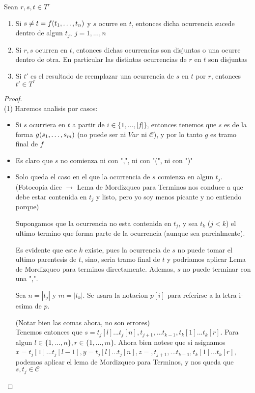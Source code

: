 \begin{lemma}
  Sean $r, s, t \in T^\tau$
  \begin{enumerate}
    \item Si $s \neq t = f(t_{1}, \dots, t_{n})$ y $s$ ocurre en $t$, entonces dicha ocurrencia sucede dentro de algun $t_j,\ j = 1, \dots, n$
    \item Si $r, s$ ocurren en $t$, entonces dichas ocurrencias son disjuntas o una ocurre dentro de otra. En particular las distintas ocurrencias de $r$ en $t$ son disjuntas
    \item Si $t'$ es el resultado de reemplazar una ocurrencia de $s$ en $t$ por $r$, entonces $t' \in T^\tau$
  \end{enumerate}
\end{lemma}
\begin{proof}
  $ $\\
  (1) Haremos analisis por casos:
  \begin{itemize}
    \item Si $s$ ocurriera en $t$ a partir de $i\in\{1,\dots,|f|\}$, entonces tenemos que $s$ es de la forma $g(s_{1}, \dots, s_{m})$ (no puede ser ni $Var$ ni $\mathcal{C}$), y por lo tanto $g$ es tramo final de $f$ \abs
    \item Es claro que $s$ no comienza ni con ",", ni con "(", ni con ")"
    \item 
    Solo queda el caso en el que la ocurrencia de $s$ comienza en algun $t_j$. (Fotocopia dice $\rightarrow$ Lema de Mordizqueo para Terminos nos conduce a que debe estar contenida en $t_j$ y listo, pero yo soy menos picante y no entiendo porque)
    
    Supongamos que la ocurrencia no esta contenida en $t_j$, y sea $t_k$ ($j<k$) el ultimo termino que forma parte de la ocurrencia (aunque sea parcialmente).
    
    Es evidente que este $k$ existe, pues la ocurrencia de $s$ no puede tomar el ultimo parentesis de $t$, sino, seria tramo final de $t$ y podriamos aplicar Lema de Mordizqueo para terminos directamente. Ademas, $s$ no puede terminar con una ",".
    
    Sea $n=|t_j|$ y $m=|t_k|$. Se usara la notacion $p[i]$ para referirse a la letra i-esima de $p$.

    (Notar bien las comas ahora, no son errores)\\
    Tenemos entonces que $s=t_j[l]... t_j[n],t_{j+1},... t_{k-1},t_k[1]... t_k[r]$. Para algun $l \in \{1,...,n\},r\in\{1,...,m\}$. Ahora bien notese que si asignamos $x = t_j[1]...t_j[l-1], y = t_j[l]...t_j[n], z = ,t_{j+1},... t_{k-1},t_k[1]... t_k[r]$, podemos aplicar 
    el lema de Mordizqueo para Terminos, y nos queda que $s,t_j\in \mathcal{C}$ \abs
  \end{itemize}


\end{proof}
